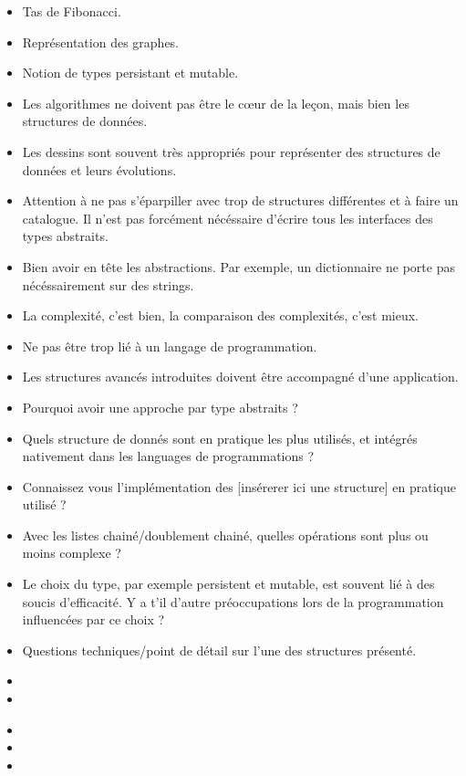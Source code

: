 \documentclass{agregfiche}
\begin{document}
\secidees

\begin{itemize}
	\item Tas de Fibonacci.
	\item Représentation des graphes.
    	\item Notion de types persistant et mutable.
\end{itemize}

\secpieges

\begin{itemize}
	\item Les algorithmes ne doivent pas être le c\oe ur de la leçon, mais bien les structures de données.
	\item Les dessins sont souvent très appropriés pour représenter des structures de données et leurs évolutions.
   	\item Attention à ne pas s'éparpiller avec trop de structures différentes et à faire un catalogue. Il n'est pas forcément nécéssaire d'écrire tous les interfaces des types abstraits.
	\item Bien avoir en tête les abstractions. Par exemple, un dictionnaire ne porte pas nécéssairement sur des strings.
	\item La complexité, c'est bien, la comparaison des complexités, c'est mieux.
	\item Ne pas être trop lié à un langage de programmation.
	\item Les structures avancés introduites doivent être accompagné d'une application.
\end{itemize}

\secquestionsclassiques

\begin{itemize}
	\item Pourquoi avoir une approche par type abstraits ?
	\item Quels structure de donnés sont en pratique les plus utilisés, et intégrés nativement dans les languages de programmations ?
	\item Connaissez vous l'implémentation des [insérerer ici une structure] en pratique utilisé ?
	\item Avec les listes chainé/doublement chainé, quelles opérations sont plus ou moins complexe ?
	\item Le choix du type, par exemple persistent et mutable, est souvent lié à des soucis d'efficacité. Y a t'il d'autre préoccupations lors de la programmation influencées par ce choix ?
    \item Questions techniques/point de détail sur l'une des structures présenté.
\end{itemize}

\secreferences

\begin{itemize}
\item 
\item 
\end{itemize}

\secdev

\begin{itemize}
\item 
\item 
\item 
\end{itemize}
\end{document}
